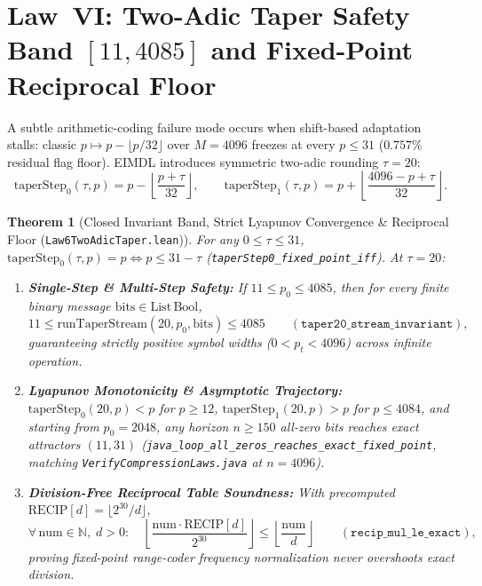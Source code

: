 \documentclass[10pt]{article}
\newtheorem{theorem}{Theorem}
\begin{document}
\section{Law~VI: Two-Adic Taper Safety Band $[11, 4085]$ and Fixed-Point Reciprocal Floor}

A subtle arithmetic-coding failure mode occurs when shift-based adaptation stalls: classic $p \mapsto p - \lfloor p/32 \rfloor$ over $M = 4096$ freezes at every $p \le 31$ ($0.757\%$ residual flag floor). EIMDL introduces symmetric two-adic rounding $\tau = 20$:
\begin{equation}
  \mathrm{taperStep}_0(\tau, p) = p - \left\lfloor \frac{p + \tau}{32} \right\rfloor, \qquad
  \mathrm{taperStep}_1(\tau, p) = p + \left\lfloor \frac{4096 - p + \tau}{32} \right\rfloor.
\end{equation}

\begin{theorem}[Closed Invariant Band, Strict Lyapunov Convergence \& Reciprocal Floor (\texttt{Law6TwoAdicTaper.lean})]
For any $0 \le \tau \le 31$, $\mathrm{taperStep}_0(\tau, p) = p \iff p \le 31 - \tau$ (\texttt{taperStep0\_fixed\_point\_iff}). At $\tau = 20$:
\begin{enumerate}
  \item \textbf{Single-Step \& Multi-Step Safety:} If $11 \le p_0 \le 4085$, then for \emph{every} finite binary message $\mathrm{bits} \in \mathrm{List}\,\mathrm{Bool}$,
  \[
    11 \le \mathrm{runTaperStream}(20, p_0, \mathrm{bits}) \le 4085 \qquad (\texttt{taper20\_stream\_invariant}),
  \]
  guaranteeing strictly positive symbol widths ($0 < p_t < 4096$) across infinite operation.
  \item \textbf{Lyapunov Monotonicity \& Asymptotic Trajectory:} $\mathrm{taperStep}_0(20, p) < p$ for $p \ge 12$, $\mathrm{taperStep}_1(20, p) > p$ for $p \le 4084$, and starting from $p_0 = 2048$, any horizon $n \ge 150$ all-zero bits reaches exact attractors $(11, 31)$ (\texttt{java\_loop\_all\_zeros\_reaches\_exact\_fixed\_point}, matching \texttt{VerifyCompressionLaws.java} at $n = 4096$).
  \item \textbf{Division-Free Reciprocal Table Soundness:} With precomputed $\mathrm{RECIP}[d] = \lfloor 2^{30}/d \rfloor$,
  \[
    \forall\,\mathrm{num} \in \mathbb{N},\; d > 0:\quad
    \left\lfloor \frac{\mathrm{num} \cdot \mathrm{RECIP}[d]}{2^{30}} \right\rfloor \le \left\lfloor \frac{\mathrm{num}}{d} \right\rfloor
    \qquad (\texttt{recip\_mul\_le\_exact}),
  \]
  proving fixed-point range-coder frequency normalization never overshoots exact division.
\end{enumerate}
\end{theorem}
\end{document}
